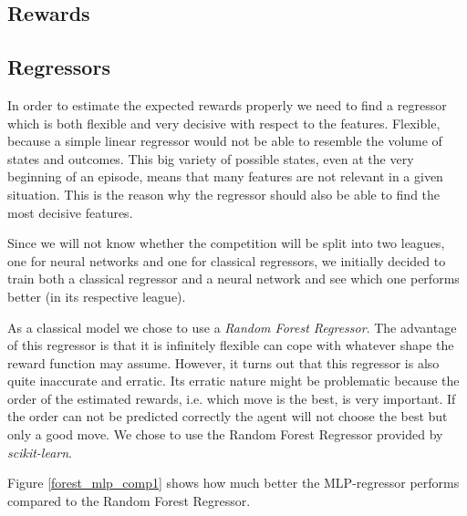 	\subsection{Rewards}
	
	
	\subsection{Regressors}
	In order to estimate the expected rewards properly we need to find a regressor which is both flexible and very decisive with respect to the features. Flexible, because a simple linear regressor would not be able to resemble the volume of states and outcomes. This big variety of possible states, even at the very beginning of an episode, means that many features are not relevant in a given situation. This is the reason why the regressor should also be able to find the most decisive features.\par
	
	Since we will not know whether the competition will be split into two leagues, one for neural networks and one for classical regressors, we initially decided to train both a classical regressor and a neural network and see which one performs better (in its respective league).\par
	
	As a classical model we chose to use a \textit{Random Forest Regressor}. The advantage of this regressor is that it is infinitely flexible can cope with whatever shape the reward function may assume. However, it turns out that this regressor is also quite inaccurate and erratic. Its erratic nature might be problematic because the order of the estimated rewards, i.e. which move is the best, is very important. If the order can not be predicted correctly the agent will not choose the best but only a good move. We chose to use the Random Forest Regressor provided by \textit{scikit-learn}.
	
	Figure \ref{forest_mlp_comp1} shows how much better the MLP-regressor performs compared to the Random Forest Regressor.

